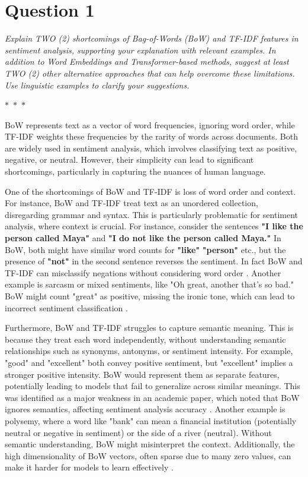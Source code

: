 \section*{Question 1}

\textit{Explain TWO (2) shortcomings of Bag-of-Words (BoW) and TF-IDF features in sentiment analysis, supporting your explanation with relevant examples. In addition to Word Embeddings and Transformer-based methods, suggest at least TWO (2) other alternative approaches that can help overcome these limitations. Use linguistic examples to clarify your suggestions.}

\begin{center}
  $\ast$~$\ast$~$\ast$
\end{center}

BoW represents text as a vector of word frequencies, ignoring word order, while TF-IDF weights these frequencies by the rarity of words across documents. Both are widely used in sentiment analysis, which involves classifying text as positive, negative, or neutral. However, their simplicity can lead to significant shortcomings, particularly in capturing the nuances of human language.

One of the shortcomings of BoW and TF-IDF is loss of word order and context. For instance, BoW and TF-IDF treat text as an unordered collection, disregarding grammar and syntax. This is particularly problematic for sentiment analysis, where context is crucial. For instance, consider the sentences \textbf{"I like the person called Maya"} and \textbf{"I do not like the person called Maya."} In BoW, both might have similar word counts for \textbf{"like"} \textbf{"person"} etc., but the presence of \textbf{"not"} in the second sentence reverses the sentiment. In fact BoW and TF-IDF can misclassify negations without considering word order \parencite{mohey_enhancement_2016}. Another example is sarcasm or mixed sentiments, like "Oh great, another that's so bad." BoW might count "great" as positive, missing the ironic tone, which can lead to incorrect sentiment classification \parencite{brownlee_how_2020}.

Furthermore, BoW and TF-IDF struggles to capture semantic meaning. This is because they treat each word independently, without understanding semantic relationships such as synonyms, antonyms, or sentiment intensity. For example, "good" and "excellent" both convey positive sentiment, but "excellent" implies a stronger positive intensity. BoW would represent them as separate features, potentially leading to models that fail to generalize across similar meanings. This was identified as a major weakness in an academic paper, which noted that BoW ignores semantics, affecting sentiment analysis accuracy \parencite{mohey_enhancement_2016}. Another example is polysemy, where a word like "bank" can mean a financial institution (potentially neutral or negative in sentiment) or the side of a river (neutral). Without semantic understanding, BoW might misinterpret the context. Additionally, the high dimensionality of BoW vectors, often sparse due to many zero values, can make it harder for models to learn effectively \parencite{brownlee_how_2020}.

